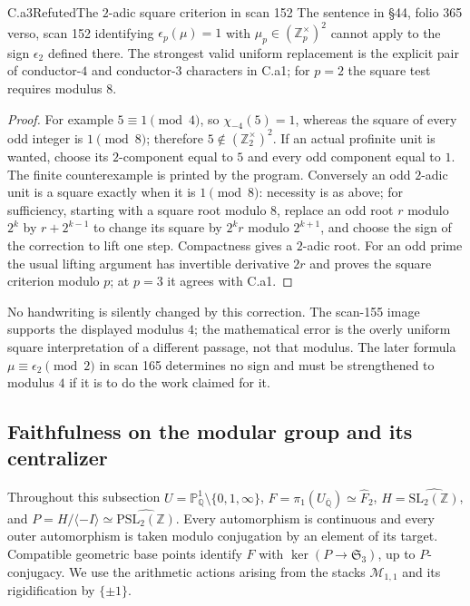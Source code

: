 \begin{claim}{C.a3}{Refuted}{The $2$-adic square criterion in scan 152}
The sentence in \S44, folio 365 verso, scan 152 identifying
$\epsilon_p(\mu)=1$ with $\mu_p\in(\mathbb Z_p^{\times})^2$ cannot
apply to the sign $\epsilon_2$ defined there. The strongest valid uniform
replacement is the explicit pair of conductor-$4$ and conductor-$3$
characters in C.a1; for $p=2$ the square test requires modulus $8$.
\end{claim}
\begin{proof}
For example $5\equiv1\pmod4$, so $\chi_{-4}(5)=1$, whereas the square
of every odd integer is $1\pmod8$; therefore $5\notin
(\mathbb Z_2^{\times})^2$. If an actual profinite unit is wanted, choose
its $2$-component equal to $5$ and every odd component equal to $1$.
The finite counterexample is printed by the program. Conversely an odd
$2$-adic unit is a square exactly when it is $1\pmod8$: necessity is
as above; for sufficiency, starting with a square root modulo $8$, replace
an odd root $r$ modulo $2^k$ by $r+2^{k-1}$ to change its square by
$2^kr$ modulo $2^{k+1}$, and choose the sign of the correction to lift
one step. Compactness gives a $2$-adic root. For an odd prime the usual
lifting argument has invertible derivative $2r$ and proves the square
criterion modulo $p$; at $p=3$ it agrees with C.a1.
\end{proof}
No handwriting is silently changed by this correction. The scan-155 image
supports the displayed modulus $4$; the mathematical error is the overly
uniform square interpretation of a different passage, not that modulus.
The later formula $\mu\equiv\epsilon_2\pmod2$ in scan 165 determines
no sign and must be strengthened to modulus $4$ if it is to do the work
claimed for it.

\subsection{Faithfulness on the modular group and its centralizer}

Throughout this subsection $U=\mathbb P^1_{\mathbb Q}\setminus
\{0,1,\infty\}$,
$F=\pi_1(U_{\overline{\mathbb Q}})\simeq\widehat F_2$,
$H=\widehat{\mathrm{SL}_2(\mathbb Z)}$, and
$P=H/\langle -I\rangle\simeq\widehat{\mathrm{PSL}_2(\mathbb Z)}$.
Every automorphism is continuous and every outer automorphism is taken
modulo conjugation by an element of its target. Compatible geometric
base points identify $F$ with $\ker(P\to\mathfrak S_3)$, up to
$P$-conjugacy. We use the arithmetic actions arising from the stacks
$\mathcal M_{1,1}$ and its rigidification by $\{\pm1\}$.

